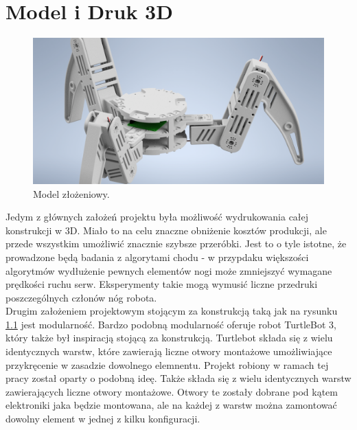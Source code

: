 \chapter{Model i Druk 3D}
\begin{figure}[h!]
\includegraphics[width=\textwidth]{img/CAD_assembly.png}
\caption{Model złożeniowy.}
\label{CAD_assembly}
\end{figure}
Jedym z głównych założeń projektu była możliwość wydrukowania całej konstrukcji w 3D. Miało to na celu znaczne obniżenie kosztów produkcji, ale przede wszystkim umożliwić znacznie szybsze przeróbki. Jest to o tyle istotne, że prowadzone będą badania z algorytami chodu - w przypdaku większości algorytmów wydłużenie pewnych elementów nogi może zmniejszyć wymagane prędkości ruchu serw. Eksperymenty takie mogą wymusić liczne przedruki poszczególnych członów nóg robota.\\

Drugim założeniem projektowym stojącym za konstrukcją taką jak na rysunku \ref{CAD_assembly} jest modularność. Bardzo podobną modularność oferuje robot TurtleBot 3, który także był inspiracją stojącą za konstrukcją. Turtlebot składa się z wielu identycznych warstw, które zawierają liczne otwory montażowe umożliwiające przykręcenie w zasadzie dowolnego elemnentu. Projekt robiony w ramach tej pracy został oparty o podobną ideę. Także składa się z wielu identycznych warstw zawierających liczne otwory montażowe. Otwory te zostały dobrane pod kątem elektroniki jaka będzie montowana, ale na każdej z warstw można zamontować dowolny element w jednej z kilku konfiguracji.\\

